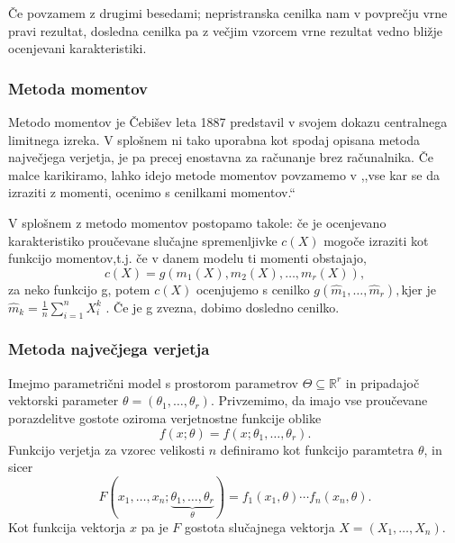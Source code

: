 \documentclass[12pt,a4paper]{amsart}
\theoremstyle{definition} %
\theoremstyle{plain} %
\begin{document}
Če povzamem z drugimi besedami; nepristranska cenilka nam v povprečju vrne pravi rezultat, dosledna cenilka pa z večjim vzorcem vrne rezultat vedno
bližje ocenjevani karakteristiki.

\subsubsection{Metoda momentov}
Metodo momentov je Čebišev leta 1887 predstavil v svojem dokazu centralnega limitnega izreka. V splošnem ni tako uporabna kot spodaj opisana metoda največjega
verjetja, je pa precej enostavna za računanje brez računalnika. Če malce karikiramo, lahko idejo metode momentov povzamemo v \:
,,vse kar se da izraziti z momenti, ocenimo s cenilkami momentov.``

V splošnem z metodo momentov postopamo takole: če je ocenjevano karakteristiko proučevane slučajne spremenljivke $c(X)$ mogoče izraziti kot funkcijo 
momentov,t.j. če v danem modelu ti momenti obstajajo, 
\[
    c(X) = g(m_{1}(X), m_{2}(X),\ldots,m_{r}(X)),
\] za neko funkcijo g, potem $c(X)$ ocenjujemo s cenilko $g(\hat{m}_{1},\ldots,\hat{m}_{r}), $kjer je $\hat{m}_{k} = \frac{1}{n}\sum_{i=1}^{n}X^{k}_{i}$ . Če je g zvezna, dobimo dosledno cenilko.

\subsubsection{Metoda največjega verjetja} %
Imejmo parametrični model s prostorom parametrov $\Theta \subseteq \mathbb{R}^{r}$ in pripadajoč vektorski parameter $\theta = (\theta_{1},\ldots,\theta_{r}).$
Privzemimo, da imajo vse proučevane porazdelitve gostote oziroma verjetnostne funkcije oblike
\[
    f(x;\theta) = f(x;\theta_{1},\ldots,\theta_{r}).
\]
Funkcijo verjetja za vzorec velikosti $n$ definiramo kot funkcijo paramtetra $\theta$, in sicer
\[
    F(x_{1},\ldots,x_{n};\underbrace{\theta_{1},\ldots,\theta_{r}}_{\theta}) = f_{1}(x_{1},\theta)\cdots f_{n}(x_{n},\theta).
\]
Kot funkcija vektorja $x$ pa je $F$ gostota slučajnega vektorja $X = (X_{1},\ldots,X_{n}).$
\end{document}
